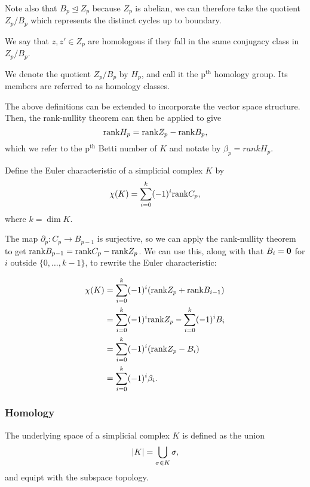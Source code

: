 Note also that $B_p \unlhd Z_p$ because $Z_p$ is abelian, we can therefore take the quotient $Z_p / B_p$ which represents the distinct cycles up to boundary.   

\begin{definition}
    We say that $z, z' \in Z_p$ are homologous if they fall in the same conjugacy class in $Z_p / B_p$.
\end{definition}

We denote the quotient $Z_p / B_p$ by $H_p$, and call it the p$^{\text{th}}$ homology group. Its members are referred to as homology classes.

The above definitions can be extended to incorporate the vector space structure. Then, the rank-nullity theorem can then be applied to give 
$$
\textrm{rank} H_p = \textrm{rank} Z_p - \textrm{rank} B_p,
$$
which we refer to the p$^{\text{th}}$ Betti number of $K$ and notate by $\beta_p = rank H_p$.

\begin{definition}
    Define the Euler characteristic of a simplicial complex $K$ by 
    $$
    \chi(K) = \sum_{i=0}^k (-1)^i \textrm{rank} C_p,
    $$
    where $k = \dim K$.
\end{definition}

The map $\partial_p: C_p \rightarrow B_{p-1}$ is surjective, so we can apply the rank-nullity theorem to get $\textrm{rank} B_{p-1} = \textrm{rank} C_p - \textrm{rank} Z_p$. We can use this, along with that $B_i = \mathbf{0}$ for $i$ outside $\{0, \ldots, k-1\}$, to rewrite the Euler characteristic:

\begin{align*}
    \chi(K) 
    &= \sum_{i=0}^k (-1)^i (\textrm{rank} Z_p + \textrm{rank} B_{i-1}) \\
    &= \sum_{i=0}^k (-1)^i \textrm{rank} Z_p - \sum_{i=0}^k (-1)^i B_{i} \\
    &= \sum_{i=0}^k (-1)^i (\textrm{rank} Z_p - B_{i}) \\
    &= \sum_{i=0}^k (-1)^i \beta_i.
\end{align*}


\subsubsection{Homology}

\begin{definition}
    The underlying space of a simplicial complex $K$ is defined as the union
    $$
    \lvert K\rvert = \bigcup_{\sigma \in K} \sigma,
    $$
    and equipt with the subspace topology.
\end{definition}


